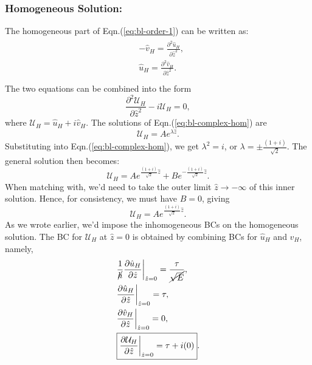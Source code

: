 \documentclass{article}
\newcommand{\pd}[2]{\frac{\partial{#1}}{\partial{#2}}}
\newcommand{\pdd}[2]{\frac{\partial^2{#1}}{\partial{#2}^2}}
\begin{document}
\subsubsection{Homogeneous Solution:}
The homogeneous part of Eqn.(\ref{eq:bl-order-1}) can be written as:
\begin{align}
 \begin{split}
  & -\hat{v}_{H} = \pdd{\hat{u}_{H}}{\hat{z} },\\
  &\hat{u}_{H} = \pdd{\hat{v}_{H}}{\hat{z} }.\\
 \end{split}
\end{align}
%
The two equations can be combined into the form
\begin{equation}\label{eq:bl-complex-hom}
\pdd{\mathcal{U}_{H}}{\hat{z}} - i \mathcal{U}_{H} = 0,
\end{equation}
where $ \mathcal{U}_{H} = \hat{u}_{H} + i \hat{v}_{H}$. The solutions of Eqn.(\ref{eq:bl-complex-hom}) are 
\begin{equation}
 \mathcal{U}_{H} = A e^{\lambda \hat{z}}.
\end{equation}
%
Substituting into Eqn.(\ref{eq:bl-complex-hom}), we get $\lambda^{2} = i$, or $\lambda = \pm \frac{(1+i)}{\sqrt{2}}$. The general solution then becomes:
\begin{equation}\label{eq:bl-complex-hom-gen-soln}
 \mathcal{U}_{H} = A e^{\frac{(1+i)}{\sqrt{2}}\hat{z}} + B e^{-\frac{(1+i)}{\sqrt{2}}\hat{z}}.
\end{equation}
%
When matching with, we'd need to take the outer limit $\hat{z}\rightarrow -\infty$ of this inner solution. Hence, for consistency, we must have $\boxed{B = 0}$, giving 
%
\begin{equation}\label{eq:bl-complex-hom-upper}
 \mathcal{U}_{H} = A e^{\frac{(1+i)}{\sqrt{2}}\hat{z}}.
\end{equation}
As we wrote earlier, we'd impose the inhomogeneous BCs on the homogeneous solution. The BC for $\mathcal{U}_{H}$ at $\hat{z} = 0$ is obtained by combining BCs for $\hat{u}_{H}$ and $\hat{v}_{H}$, namely,
\begin{align}\label{eq:bl-complex-hom-upper-bc}
 \begin{split}
  &\frac{1}{\cancel{h} }\pd{\hat{u}_{H}}{\hat{z}}\bigg|_{\hat{z} = 0} = \frac{\tau}{\cancel{\sqrt{E} }},\\
  & \pd{\hat{u}_{H}}{\hat{z}}\bigg|_{\hat{z} = 0} = \tau, \\
  &\pd{\hat{v}_{H}}{\hat{z}}\bigg|_{\hat{z} = 0} = 0,\\
  &\boxed{\pd{\mathcal{U}_{H}}{\hat{z}}\bigg|_{\hat{z} = 0} = \tau + i(0) }.\\
 \end{split}
\end{align}
\end{document}
